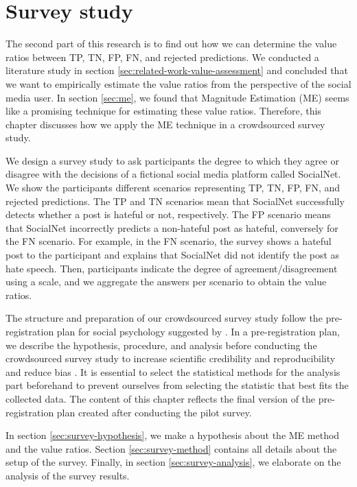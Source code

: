 \chapter{Survey study}
\label{ch:survey}
The second part of this research is to find out how we can determine the value ratios between TP, TN, FP, FN, and rejected predictions.
%
We conducted a literature study in section \ref{sec:related-work-value-assessment} and concluded that we want to empirically  estimate the value ratios from the perspective of the social media user.
%
In section \ref{sec:me}, we found that Magnitude Estimation (ME) seems like a promising technique for estimating these value ratios.
%
Therefore, this chapter discusses how we apply the ME technique in a crowdsourced survey study.
%

%
We design a survey study to ask participants the degree to which they agree or disagree with the decisions of a fictional social media platform called SocialNet.
%
We show the participants different scenarios representing TP, TN, FP, FN, and rejected predictions.
%
The TP and TN scenarios mean that SocialNet successfully detects whether a post is hateful or not, respectively.
%
The FP scenario means that SocialNet incorrectly predicts a non-hateful post as hateful, conversely for the FN scenario.
%
For example, in the FN scenario, the survey shows a hateful post to the participant and explains that SocialNet did not identify the post as hate speech.
%
Then, participants indicate the degree of agreement/disagreement using a scale, and we aggregate the answers per scenario to obtain the value ratios.
%

%
The structure and preparation of our crowdsourced survey study follow the pre-registration plan for social psychology suggested by \citet{van2016pre}.
%
In a pre-registration plan, we describe the hypothesis, procedure, and analysis before conducting the crowdsourced survey study to increase scientific credibility and reproducibility and reduce bias \citep{van2016pre}.
%
It is essential to select the statistical methods for the analysis part beforehand to prevent ourselves from selecting the statistic that best fits the collected data.
%
The content of this chapter reflects the final version of the pre-registration plan created after conducting the pilot survey.
%

%
In section \ref{sec:survey-hypothesis}, we make a hypothesis about the ME method and the value ratios.
%
Section \ref{sec:survey-method} contains all details about the setup of the survey.
%
Finally, in section \ref{sec:survey-analysis}, we elaborate on the analysis of the survey results.

